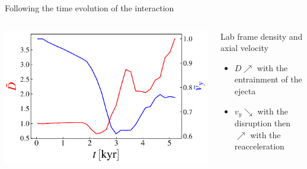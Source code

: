 \begin{frame}{Following the time evolution of the interaction}
\begin{columns}
\begin{column}{.5\textwidth}
      \includegraphics[width=\linewidth]{images/evolution_integrated_xz_d_vy_2_riot.pdf}
	   \end{column}
	   \begin{column}{.5\textwidth}
		{\footnotesize
		\begin{block}{Lab frame density and axial velocity}
			\begin{itemize}
				\item $D \nearrow$ with the entrainment of the ejecta
				\item $v_y \searrow$ with the disruption then $\nearrow$ with the reacceleration
			\end{itemize}
		\end{block}}
	   \end{column}
	\end{columns}
\end{frame}

